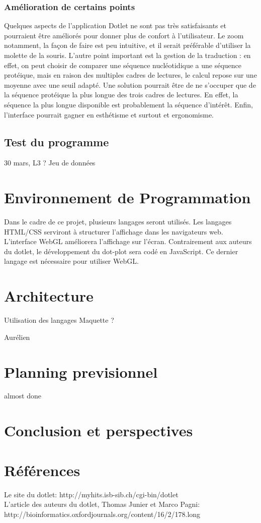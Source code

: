 \documentclass{report}
\begin{document}
\subsection{Amélioration de certains points}
Quelques aspects de l'application Dotlet ne sont pas très satisfaisants et pourraient être améliorés pour donner plus de confort à l'utilisateur. Le zoom notamment, la façon de faire est peu intuitive, et il serait préférable d'utiliser la molette de la souris. L'autre point important est la gestion de la traduction : en effet, on peut choisir de comparer une séquence nucléotidique a une séquence protéique, mais en raison des multiples cadres de lectures, le calcul repose sur une moyenne avec une seuil adapté. Une solution pourrait être de ne s'occuper que de la séquence protéique la plus longue des trois cadres de lectures. En effet, la séquence la plus longue disponible est probablement la séquence d'intérêt. Enfin, l'interface pourrait gagner en esthétisme et surtout et ergonomisme.

\section{Test du programme}

30 mars, L3 ?
Jeu de données

\chapter{Environnement de Programmation}

Dans le cadre de ce projet, plusieurs langages seront utilisés. Les langages HTML/CSS serviront à structurer l'affichage dans les navigateurs web. L'interface WebGL améliorera l'affichage sur l'écran. Contrairement aux auteurs du dotlet, le développement du dot-plot sera codé en JavaScript.  Ce dernier langage est nécessaire pour utiliser WebGL.


\chapter{Architecture}
Utilisation des langages
Maquette ?

Aurélien


\chapter{Planning previsionnel}
almost done



\chapter*{Conclusion et perspectives}


\chapter*{Références}
Le site du dotlet: http://myhits.isb-sib.ch/cgi-bin/dotlet\\
L'article des auteurs du dotlet, Thomas Junier et Marco Pagni: http://bioinformatics.oxfordjournals.org/content/16/2/178.long\\
\end{document}
